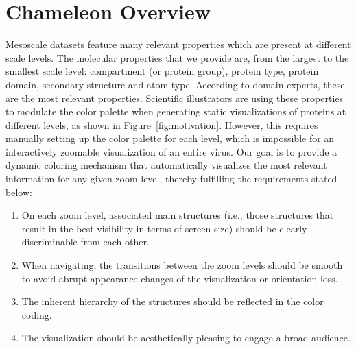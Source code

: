 \documentclass{egpubl}
\begin{document}
%	


	

		
	\section{Chameleon Overview}
	\label{Overview}
	
	Mesoscale datasets feature many relevant properties which are present at different scale levels.
	The molecular properties that we provide are, from the largest to the smallest scale level: compartment (or protein group), protein type, protein domain, secondary structure and atom type.
	According to domain experts, these are the most relevant properties. %
	Scientific illustrators are using these properties to modulate the color palette when generating static visualizations of proteins at different levels, as shown in Figure~\ref{fig:motivation}.
	However, this requires manually setting up the color palette for each level, which is impossible for an interactively zoomable visualization of an entire virus. 
	Our goal is to provide a dynamic coloring mechanism that automatically visualizes the most relevant information for any given zoom level, thereby fulfilling the requirements stated below: 
		
	\begin{enumerate}
		\item On each zoom level, associated main structures (i.e., those structures that result in the best visibility in terms of screen size) should be clearly discriminable from each other. 
		\item When navigating, the transitions between the zoom levels should be smooth to avoid abrupt appearance changes of the visualization or orientation loss. 
		\item The inherent hierarchy of the structures should be reflected in the color coding. 
		\item The visualization should be aesthetically pleasing to engage a broad audience. 
	\end{enumerate}
	
\end{document}
